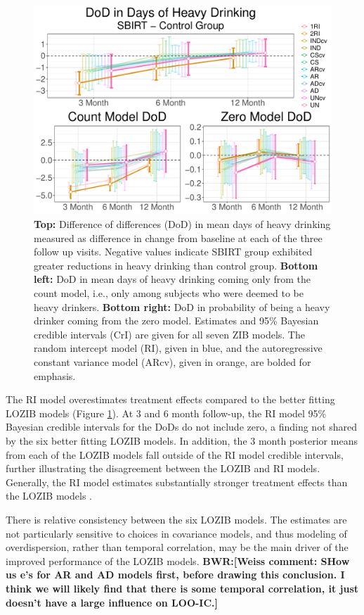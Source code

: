 \documentclass[12pt]{article}
\def\bwr#1{{\color{violet}\textbf{BWR:[#1]}}}
\begin{document}
\begin{figure}[t]
	\centering
	\includegraphics[scale=.5]{figures/DoDAllPlots.pdf}
	\caption{\textbf{Top:} Difference of differences (DoD) in mean days of heavy drinking measured as difference in change from baseline at each of the three follow up visits. Negative values indicate SBIRT group exhibited greater reductions in heavy drinking than control group. \textbf{Bottom left:} DoD in mean days of heavy drinking coming only from the count model, i.e., only among subjects who were deemed to be heavy drinkers. \textbf{Bottom right:} DoD in probability of being a heavy drinker coming from the zero model. Estimates and 95\% Bayesian credible intervals (CrI) are given for all seven ZIB models. The random intercept model (RI), given in blue, and the autoregressive constant variance model (ARcv), given in orange, are bolded for emphasis.}
	\label{fig:DoDplots}
\end{figure}


The RI model overestimates treatment effects compared to the better fitting LOZIB models (Figure \ref{fig:DoDplots}). At 3 and 6 month follow-up, the RI model 95\% Bayesian credible intervals for the DoDs do not include zero, a finding not shared by the six better fitting LOZIB models. In addition, the 3 month posterior means from each of the LOZIB models fall outside of the RI model credible intervals, further illustrating the disagreement between the LOZIB and RI models. Generally, the RI model estimates substantially stronger treatment effects than the LOZIB models .

There is relative consistency between the six LOZIB models. The estimates are not particularly sensitive to choices in covariance models, and thus modeling of overdispersion, rather than temporal correlation, may be the main driver of the improved performance of the LOZIB models. \bwr{Weiss comment: SHow us e's for AR and AD models first, before drawing this conclusion. I think we will likely find that there is some temporal correlation, it just doesn't have a large influence on LOO-IC.}
\end{document}
